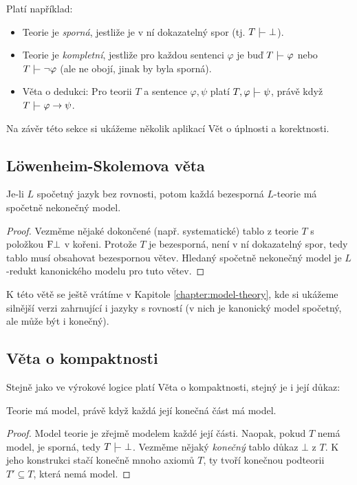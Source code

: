 Platí například:
\begin{itemize}
    \item Teorie je \emph{sporná}, jestliže je v ní dokazatelný spor (tj. $T\proves\bot$).
    \item Teorie je \emph{kompletní}, jestliže pro každou sentenci $\varphi$ je buď $T\proves\varphi$ nebo $T\proves\neg\varphi$ (ale ne obojí, jinak by byla sporná).
    \item Věta o dedukci: Pro teorii $T$ a sentence $\varphi,\psi$ platí $T,\varphi\proves\psi$, právě když $T\proves\varphi\to\psi$.
\end{itemize}

Na závěr této sekce si ukážeme několik aplikací Vět o úplnosti a korektnosti.

\subsection{Löwenheim-Skolemova věta}\label{subsection:loewenheim-skolem-theorem}

\begin{theorem}
    Je-li $L$ spočetný jazyk bez rovnosti, potom každá bezesporná $L$-teorie má spočetně nekonečný model.
\end{theorem}

\begin{proof}
Vezměme nějaké dokončené (např. systematické) tablo z teorie $T$ s položkou $\mathrm{F}\bot$ v kořeni. Protože $T$ je bezesporná, není v ní dokazatelný spor, tedy tablo musí obsahovat bezespornou větev. Hledaný spočetně nekonečný model je $L$-redukt kanonického modelu pro tuto větev.
\end{proof}

K této větě se ještě vrátíme v Kapitole \ref{chapter:model-theory}, kde si ukážeme silnější verzi zahrnující i jazyky s rovností (v nich je kanonický model spočetný, ale může být i konečný).

\subsection{Věta o kompaktnosti}

Stejně jako ve výrokové logice platí Věta o kompaktnosti, stejný je i její důkaz:

\begin{theorem}[O kompaktnosti]\label{theorem:compactness-theorem-predicate}
    Teorie má model, právě když každá její konečná část má model.    
\end{theorem}
\begin{proof}
Model teorie je zřejmě modelem každé její části. Naopak, pokud $T$ nemá model, je sporná, tedy $T\proves\bot$. Vezměme nějaký \emph{konečný} tablo důkaz $\bot$ z $T$. K jeho konstrukci stačí konečně mnoho axiomů $T$, ty tvoří konečnou podteorii $T'\subseteq T$, která nemá model.
\end{proof}


